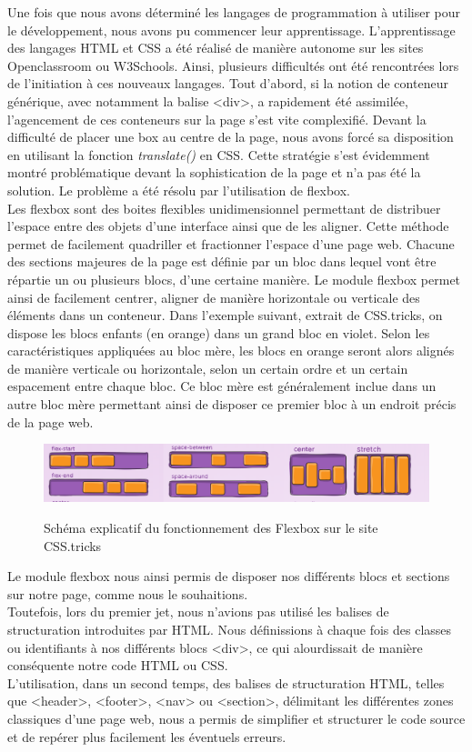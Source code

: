 \documentclass[oneside,a4paper,13pt]{article}
\begin{document}
Une fois que nous avons déterminé les langages de programmation à utiliser pour le développement, nous avons pu commencer leur apprentissage.
\bigbreak
L’apprentissage des langages HTML et CSS a été réalisé de manière autonome sur les sites Openclassroom ou W3Schools. Ainsi, plusieurs difficultés ont été rencontrées lors de l’initiation à ces nouveaux langages. 
\medbreak 
Tout d’abord, si la notion de conteneur générique, avec notamment la balise <div>, a rapidement été assimilée, l’agencement de ces conteneurs sur la page s’est vite complexifié. Devant la difficulté de placer une box au centre de la page, nous avons forcé sa disposition en utilisant la fonction \textit{translate()} en CSS. Cette stratégie s’est évidemment montré problématique devant la sophistication de la page et n’a pas été la solution. 
Le problème a été résolu par l’utilisation de flexbox. \\Les flexbox sont des boites flexibles unidimensionnel permettant de distribuer l'espace entre des objets d'une interface ainsi que de les aligner. Cette méthode permet de facilement quadriller et fractionner l'espace d’une page web. Chacune des sections majeures de la page est définie par un bloc dans lequel vont être répartie un ou plusieurs blocs, d’une certaine manière. Le module flexbox permet ainsi de facilement centrer, aligner de manière horizontale ou verticale des éléments dans un conteneur. 
\smallbreak
Dans l’exemple suivant, extrait de CSS.tricks, on dispose les blocs enfants (en orange) dans un grand bloc en violet. Selon les caractéristiques appliquées au bloc mère, les blocs en orange seront alors alignés de manière verticale ou horizontale, selon un certain ordre et un certain espacement entre chaque bloc. Ce bloc mère est généralement inclue dans un autre bloc mère permettant ainsi de disposer ce premier bloc à un endroit précis de la page web. 

\begin{figure}[H]
    \centering
    \includegraphics[scale=0.6]{Images/flexbox.png}
    \label{fig:neural_network}
    \caption{Schéma explicatif du fonctionnement des Flexbox sur le site CSS.tricks}
\end{figure}

Le module flexbox nous ainsi permis de disposer nos différents blocs et sections sur notre page, comme nous le souhaitions. \\ Toutefois, lors du premier jet, nous n’avions pas utilisé les balises de structuration introduites par HTML. Nous définissions à chaque fois des classes ou identifiants à nos différents blocs <div>, ce qui alourdissait de manière conséquente notre code HTML ou CSS. \\
L’utilisation, dans un second temps, des balises de structuration HTML,  telles que <header>, <footer>, <nav> ou <section>, délimitant les différentes zones classiques d’une page web, nous a permis de simplifier et structurer le code source et de repérer plus facilement les éventuels erreurs. 
\end{document}
